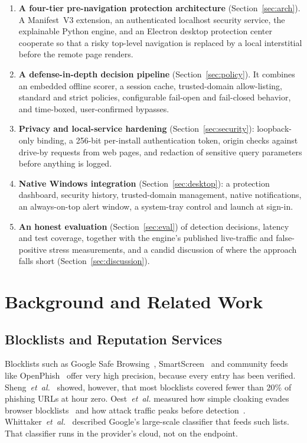 \documentclass[conference]{IEEEtran}
\begin{document}
\begin{enumerate}
  \item \textbf{A four-tier pre-navigation protection architecture}
  (Section~\ref{sec:arch}). A Manifest~V3 extension, an authenticated
  localhost security service, the explainable Python engine, and an Electron
  desktop protection center cooperate so that a risky top-level navigation is
  replaced by a local interstitial before the remote page renders.
  \item \textbf{A defense-in-depth decision pipeline}
  (Section~\ref{sec:policy}). It combines an embedded offline scorer, a
  session cache, trusted-domain allow-listing, standard and strict policies,
  configurable fail-open and fail-closed behavior, and time-boxed,
  user-confirmed bypasses.
  \item \textbf{Privacy and local-service hardening}
  (Section~\ref{sec:security}): loopback-only binding, a 256-bit per-install
  authentication token, origin checks against drive-by requests from web
  pages, and redaction of sensitive query parameters before anything is
  logged.
  \item \textbf{Native Windows integration}
  (Section~\ref{sec:desktop}): a protection dashboard, security history,
  trusted-domain management, native notifications, an always-on-top alert
  window, a system-tray control and launch at sign-in.
  \item \textbf{An honest evaluation} (Section~\ref{sec:eval}) of detection
  decisions, latency and test coverage, together with the engine's published
  live-traffic and false-positive stress measurements, and a candid
  discussion of where the approach falls short (Section~\ref{sec:discussion}).
\end{enumerate}

\section{Background and Related Work}
\label{sec:related}

\subsection{Blocklists and Reputation Services}
Blocklists such as Google Safe Browsing~\cite{gsb}, SmartScreen~\cite{smartscreen}
and community feeds like OpenPhish~\cite{openphish} offer very high precision,
because every entry has been verified. Sheng~\emph{et~al.}~\cite{sheng2009}
showed, however, that most blocklists covered fewer than 20\% of phishing URLs
at hour zero. Oest~\emph{et~al.} measured how simple cloaking evades browser
blocklists~\cite{oest2019phishfarm} and how attack traffic peaks before
detection~\cite{oest2020sunrise}. Whittaker~\emph{et~al.}~\cite{whittaker2010}
described Google's large-scale classifier that feeds such lists. That
classifier runs in the provider's cloud, not on the endpoint.
\end{document}
